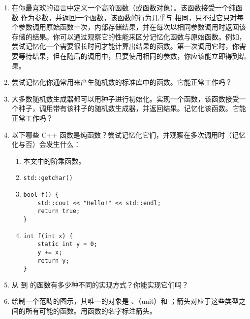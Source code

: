 \begin{enumerate}
  \tightlist
  \item
  在你最喜欢的语言中定义一个高阶函数（或函数对象）。该函数接受一个纯函数  作为参数，并返回一个函数，该函数的行为几乎与  相同，只不过它只对每个参数调用原始函数一次，内部存储结果，并在每次以相同参数调用时返回该存储的结果。你可以通过观察它的性能来区分记忆化函数与原始函数。例如，尝试记忆化一个需要很长时间才能计算出结果的函数。第一次调用它时，你需要等待结果，但在随后的调用中，只要使用相同的参数，你应该能立即得到结果。
  \item
  尝试记忆化你通常用来产生随机数的标准库中的函数。它能正常工作吗？
  \item
  大多数随机数生成器都可以用种子进行初始化。实现一个函数，该函数接受一个种子，调用带有该种子的随机数生成器，并返回结果。记忆化该函数。它能正常工作吗？
  \item
  以下哪些 C++ 函数是纯函数？尝试记忆化它们，并观察在多次调用时（记忆化与否）会发生什么：

  \begin{enumerate}
    \tightlist
    \item
    本文中的阶乘函数。
    \item
    \begin{verbatim}
std::getchar()
    \end{verbatim}
    \item
    \begin{verbatim}
bool f() {
    std::cout << "Hello!" << std::endl;
    return true;
}
    \end{verbatim}
    \item
    \begin{verbatim}
int f(int x) {
    static int y = 0;
    y += x;
    return y;
}
    \end{verbatim}
  \end{enumerate}
  \item
  从  到  的函数有多少种不同的实现方式？你能实现它们吗？
  \item
  绘制一个范畴的图示，其唯一的对象是 、\code{()}（unit）和 ；箭头对应于这些类型之间的所有可能的函数。用函数的名字标注箭头。
\end{enumerate}
